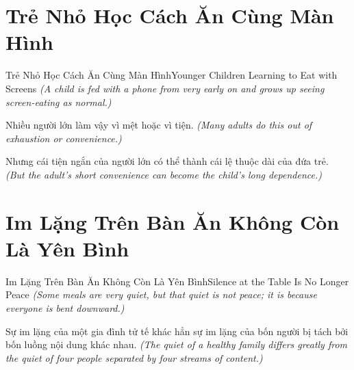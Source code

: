 \section{Trẻ Nhỏ Học Cách Ăn Cùng Màn Hình}
\begin{truyen}{Trẻ Nhỏ Học Cách Ăn Cùng Màn Hình}{Younger Children Learning to Eat with Screens}
\textit{(A child is fed with a phone from very early on and grows up seeing screen-eating as normal.)}

Nhiều người lớn làm vậy vì mệt hoặc vì tiện.
\textit{(Many adults do this out of exhaustion or convenience.)}

Nhưng cái tiện ngắn của người lớn có thể thành cái lệ thuộc dài của đứa trẻ.
\textit{(But the adult's short convenience can become the child's long dependence.)}

\end{truyen}

\section{Im Lặng Trên Bàn Ăn Không Còn Là Yên Bình}
\begin{truyen}{Im Lặng Trên Bàn Ăn Không Còn Là Yên Bình}{Silence at the Table Is No Longer Peace}
\textit{(Some meals are very quiet, but that quiet is not peace; it is because everyone is bent downward.)}

Sự im lặng của một gia đình tử tế khác hẳn sự im lặng của bốn người bị tách bởi bốn luồng nội dung khác nhau.
\textit{(The quiet of a healthy family differs greatly from the quiet of four people separated by four streams of content.)}

\end{truyen}

